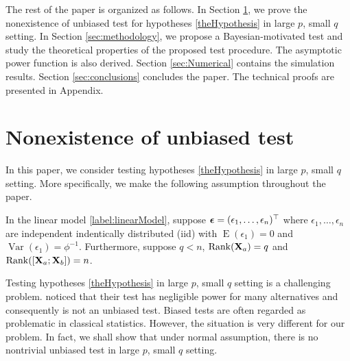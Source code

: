 \documentclass[smallextended]{svjour3}       %
\DeclareMathOperator{\myRank}{Rank}
\DeclareMathOperator{\myE}{E}
\DeclareMathOperator{\myVar}{Var}
\begin{document}
The rest of the paper is organized as follows.
In Section \ref{sec:unbiased}, we prove the nonexistence of unbiased test for hypotheses \eqref{theHypothesis} in large $p$, small $q$ setting.
In Section \ref{sec:methodology}, we propose a Bayesian-motivated test and study the theoretical properties of the proposed test procedure.
The asymptotic power function is also derived.
Section \ref{sec:Numerical} contains the simulation results. 
Section \ref{sec:conclusions} concludes the paper.
The technical proofs are presented in Appendix.


\section{Nonexistence of unbiased test}\label{sec:unbiased}

In this paper, we consider testing hypotheses \eqref{theHypothesis} in large $p$, small $q$ setting.
More specifically, we make the following assumption throughout the paper.
\begin{assumption}
    In the linear model \eqref{label:linearModel}, 
    suppose $\boldsymbol{\epsilon}=(\epsilon_1,\ldots,\epsilon_n)^\top$ where $\epsilon_1,\ldots, \epsilon_n$ are independent indentically distributed (iid) with $\myE (\epsilon_1) = 0$ and $\myVar (\epsilon_1) = \phi^{-1}$.
    Furthermore, suppose $q<n$, $\myRank(\BX_a)=q$ and $\myRank([\BX_a; \BX_b])=n$.
    \label{Assumption}
\end{assumption}
Testing hypotheses \eqref{theHypothesis} in large $p$, small $q$ setting is a challenging problem.
\cite{Goeman2006} noticed that their test has negligible power for many alternatives and consequently is not an unbiased test.
Biased tests are often regarded as problematic in classical statistics.
However, the situation is very different for our problem.
In fact, we shall show that under normal assumption, there is no nontrivial unbiased test in large $p$, small $q$ setting.
\end{document}
